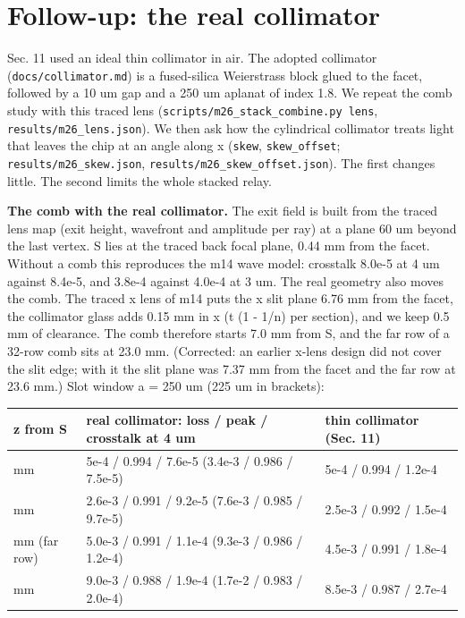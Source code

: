\hypertarget{12-follow-up-the-real-collimator}{%
\section{Follow-up: the real
collimator}\label{megascale-12-follow-up-the-real-collimator}}

Sec. 11 used an ideal thin collimator in air. The adopted collimator
(\texttt{docs/collimator.md}) is a fused-silica Weierstrass block glued
to the facet, followed by a 10 um gap and a 250 um aplanat of index 1.8.
We repeat the comb study with this traced lens
(\texttt{scripts/m26\_stack\_combine.py\ lens},
\texttt{results/m26\_lens.json}). We then ask how the cylindrical
collimator treats light that leaves the chip at an angle along x
(\texttt{skew}, \texttt{skew\_offset}; \texttt{results/m26\_skew.json},
\texttt{results/m26\_skew\_offset.json}). The first changes little. The
second limits the whole stacked relay.

\textbf{The comb with the real collimator.} The exit field is built from
the traced lens map (exit height, wavefront and amplitude per ray) at a
plane 60 um beyond the last vertex. S lies at the traced back focal
plane, 0.44 mm from the facet. Without a comb this reproduces the m14
wave model: crosstalk 8.0e-5 at 4 um against 8.4e-5, and 3.8e-4 against
4.0e-4 at 3 um. The real geometry also moves the comb. The traced x lens
of m14 puts the x slit plane 6.76 mm from the facet, the collimator
glass adds 0.15 mm in x (t (1 - 1/n) per section), and we keep 0.5 mm of
clearance. The comb therefore starts 7.0 mm from S, and the far row of a
32-row comb sits at 23.0 mm. (Corrected: an earlier x-lens design did
not cover the slit edge; with it the slit plane was 7.37 mm from the
facet and the far row at 23.6 mm.) Slot window a = 250 um (225 um in
brackets):

{\small
\begin{longtable}[]{@{}>{\raggedright\arraybackslash}p{0.181\dimexpr(\linewidth-6\tabcolsep)\relax}>{\raggedright\arraybackslash}p{0.521\dimexpr(\linewidth-6\tabcolsep)\relax}>{\raggedright\arraybackslash}p{0.298\dimexpr(\linewidth-6\tabcolsep)\relax}@{}}
\toprule\noalign{}
z from S & real collimator: loss / peak / crosstalk at 4 um & thin
collimator (Sec. 11) \\
\midrule\noalign{}
\endhead
\bottomrule\noalign{}
\endlastfoot
15 mm & 5e-4 / 0.994 / 7.6e-5 (3.4e-3 / 0.986 / 7.5e-5) & 5e-4 / 0.994 /
1.2e-4 \\
20 mm & 2.6e-3 / 0.991 / 9.2e-5 (7.6e-3 / 0.985 / 9.7e-5) & 2.5e-3 /
0.992 / 1.5e-4 \\
23.0 mm (far row) & 5.0e-3 / 0.991 / 1.1e-4 (9.3e-3 / 0.986 / 1.2e-4) &
4.5e-3 / 0.991 / 1.8e-4 \\
30 mm & 9.0e-3 / 0.988 / 1.9e-4 (1.7e-2 / 0.983 / 2.0e-4) & 8.5e-3 /
0.987 / 2.7e-4 \\
\end{longtable}
}

